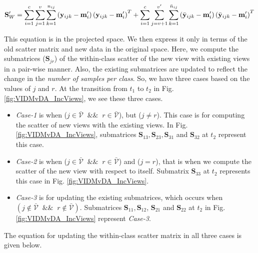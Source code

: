 \begin{equation}
\label{eqn:Add_Sw}
\mathbf{S}_W' = \sum_{i=1}^{c} \sum_{j=1}^{v} \sum_{k=1}^{n_{ij}} \left ( \mathbf{y}_{ijk} - \textbf{m}'_i \right ) \left ( \mathbf{y}_{ijk} - \textbf{m}'_i \right )^T + \sum_{i=1}^{c} \sum_{j=v+1}^{v'} \sum_{k=1}^{\bar{n}_{ij}} \left ( \bar{\mathbf{y}}_{ijk} - \textbf{m}'_i \right ) \left ( \bar{\mathbf{y}}_{ijk} - \textbf{m}'_i \right )^T\\
\end{equation}

This equation is in the projected space. We then express it only in terms of the old scatter matrix and new data in the original space. Here, we compute the submatrices ($\textbf{S}_{jr}$) of the within-class scatter of the new view with existing views in a pair-wise manner. Also, the existing submatrices are updated to reflect the change in the \textit{number of samples per class}. So, we have three cases based on the values of $j$ and $r$. At the transition from $t_1$ to $t_2$ in Fig. \ref{fig:VIDMvDA_IncViews}, we see these three cases.
\begin{itemize}
	\item \textit{Case-1} is when ($j \in \bar{\mathcal{V}} \;\;\&\&\;\; r \in \bar{\mathcal{V}}$), but ($j \neq r$). This case is for computing the scatter of new views with the existing views. In Fig. \ref{fig:VIDMvDA_IncViews}, submatrices $\textbf{S}_{13}, \textbf{S}_{23}, \textbf{S}_{31}$ and $\textbf{S}_{32}$ at $t_2$ represent this case.
	\item \textit{Case-2} is when ($j \in \bar{\mathcal{V}} \;\;\&\&\;\; r \in \bar{\mathcal{V}}$) and ($j = r$), that is when we compute the scatter of the new view with respect to itself. Submatrix $\textbf{S}_{33}$ at $t_2$ represents this case in Fig. \ref{fig:VIDMvDA_IncViews}.
	\item \textit{Case-3} is for updating the existing submatrices, which occurs when $(j \notin \bar{\mathcal{V}} \;\;\&\&\;\; r \notin \bar{\mathcal{V}})$. Submatrices $\textbf{S}_{11}, \textbf{S}_{12}$, $\textbf{S}_{21}$ and $\textbf{S}_{22}$ at $t_2$ in Fig. \ref{fig:VIDMvDA_IncViews} represent \textit{Case-3}.
\end{itemize}


The equation for updating the within-class scatter matrix in all three cases is given below.

